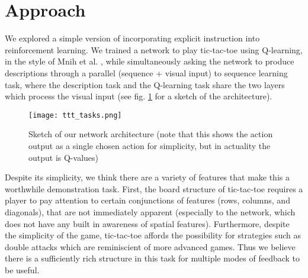 \documentclass{article} %
\begin{document}
\section{Approach}
We explored a simple version of incorporating explicit instruction into reinforcement learning. We trained a network to play tic-tac-toe using Q-learning, in the style of Mnih et al. \cite{Mnih2015}, while simultaneously asking the network to produce descriptions through a parallel (sequence + visual input) to sequence learning task, where the description task and the Q-learning task share the two layers which process the visual input (see fig. \ref{network_diagram} for a sketch of the architecture). \par 
\begin{figure}
\centering
\texttt{[image: ttt\_tasks.png]}
\caption{Sketch of our network architecture (note that this shows the action output as a single chosen action for simplicity, but in actuality the output is Q-values)}
\label{network_diagram}
\end{figure}
Despite its simplicity, we think there are a variety of features that make this a worthwhile demonstration task. First, the board structure of tic-tac-toe requires a player to pay attention to certain conjunctions of features (rows, columns, and diagonals), that are not immediately apparent (especially to the network, which does not have any built in awareness of spatial features). Furthermore, despite the simplicity of the game, tic-tac-toe affords the possibility for strategies such as double attacks which are reminiscient of more advanced games. Thus we believe there is a sufficiently rich structure in this task for multiple modes of feedback to be useful.
\end{document}

